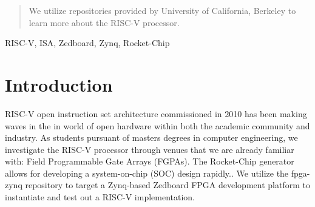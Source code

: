 \documentclass[journal]{IEEEtran}
\begin{document}


\maketitle

\begin{abstract}
We utilize repositories provided by University of California, Berkeley to learn more about the RISC-V processor. 
\end{abstract}

\begin{IEEEkeywords}
RISC-V, ISA, Zedboard, Zynq, Rocket-Chip
\end{IEEEkeywords}

%



\section{Introduction}
% 
% 
% 
% 
 RISC-V open instruction set architecture commissioned in 2010 has been making waves in the in world of open hardware within both the academic community and industry. As students pursuant of masters degrees in computer engineering, we investigate the RISC-V processor through venues that we are already familiar with: Field Programmable Gate Arrays (FGPAs).
\newline The Rocket-Chip generator allows for developing a system-on-chip (SOC) design rapidly.\cite{Asanović:EECS-2016-17}. We utilize the fpga-zynq \cite{fpga-zynq} repository to target a Zynq-based Zedboard FPGA development platform to instantiate and test out a RISC-V implementation.
\end{document}
